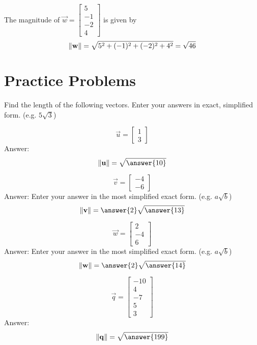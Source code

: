 \documentclass{ximera}
\begin{document}
\begin{example}\label{ex:findnorminr4}
The magnitude of $\vec{w}=\begin{bmatrix}5\\ -1\\ -2\\ 4\end{bmatrix}$ is given by
 $$\left\lVert\mathbf{w}\right\rVert=\sqrt{5^2+(-1)^2+(-2)^2+4^2}=\sqrt{46}$$ 
\end{example}

\section*{Practice Problems}
\begin{problem}%
Find the length of the following vectors.  Enter your answers in exact, simplified form. (e.g. $5\sqrt{3}$)
\begin{problem}\label{prob:magnitude1}
 $$\vec{u}=\begin{bmatrix}1\\3\end{bmatrix}$$ 
 Answer:
 $$\norm{\vec{u}}=\sqrt{\answer{10}}$$
 \end{problem}
 
 \begin{problem}\label{prob:magnitude2}
 $$\vec{v}=\begin{bmatrix}-4\\-6\end{bmatrix}$$
 Answer: Enter your answer in the most simplified exact form. (e.g. $a\sqrt{b}$)
 $$\norm{\vec{v}}=\answer{2}\sqrt{\answer{13}}$$
 \end{problem}
 
 \begin{problem}\label{prob:magnitude3}
 $$\vec{w}=\begin{bmatrix}2\\-4\\6\end{bmatrix}$$
 Answer: Enter your answer in the most simplified exact form. (e.g. $a\sqrt{b}$)
 $$\norm{\vec{w}}=\answer{2}\sqrt{\answer{14}}$$
 \end{problem}
 
 \begin{problem}\label{prob:magnitude4}
 $$\vec{q}=\begin{bmatrix}-10\\ 4\\ -7\\ 5\\ 3\end{bmatrix}$$
 Answer:
 $$\norm{\vec{q}}=\sqrt{\answer{199}}$$
 \end{problem}
 \end{problem}
 
\end{document}
